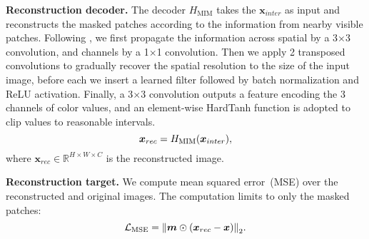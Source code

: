 \documentclass[10pt,twocolumn,letterpaper]{article}
\newcommand{\mypara}[1]{\vspace{1mm}\noindent\textbf{#1}}
\begin{document}
\mypara{Reconstruction decoder.}
The decoder $H_{\text{MIM}}$ takes the $\bm{x}_{inter}$ as input and reconstructs the masked patches according to the information from nearby visible patches.
Following \cite{Pathak_2016_Inpainting}, we first propagate the information across spatial by a 3$\times$3 convolution, and channels by a 1$\times$1 convolution.
Then we apply 2 transposed convolutions to gradually recover the spatial resolution to the size of the input image, before each we insert a learned filter followed by batch normalization and ReLU activation.
Finally, a 3$\times$3 convolution outputs a feature encoding the 3 channels of color values, and an element-wise HardTanh function is adopted to clip values to reasonable intervals.
\vspace{-4pt}
\begin{equation}
  \bm{x}_{rec} = H_{\text{MIM}}(\bm{x}_{inter}),
  \vspace{-4pt}
  \label{eq:decoder}
\end{equation}
where $\bm{x}_{rec} \in \mathbb{R}^{H \times W \times C}$ is the reconstructed image.

\mypara{Reconstruction target.}
We compute mean squared error~(MSE) over the reconstructed and original images. The computation limits to only the masked patches:
\vspace{-4pt}
\begin{equation}
  \mathcal{L}_{\text{MSE}} =  {\lVert \bm{m}\odot(\bm{x}_{rec} - \bm{x})\rVert}_2.
  \vspace{-4pt}
  \label{eq:mse}
\end{equation}
\end{document}

